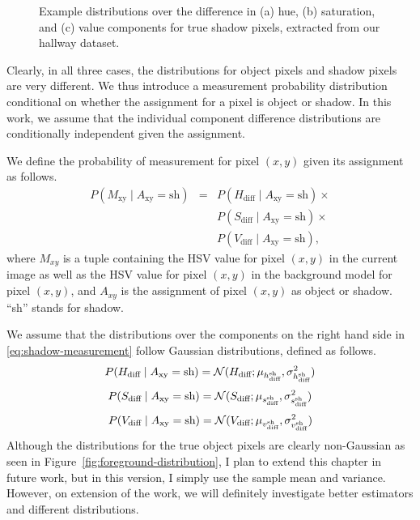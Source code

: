 \begin{figure}[t]
  \caption[Example distributions over the difference in hue,
    saturation, and value components for true shadow pixels, extracted
    from our hallway dataset.]{\small Example distributions over the
    difference in (a) hue, (b) saturation, and (c) value components
    for true shadow pixels, extracted from our hallway dataset.}
  \label{fig:shadow-distribution}
\end{figure}

Clearly, in all three cases, the distributions for object pixels and
shadow pixels are very different.  We thus introduce a measurement
probability distribution conditional on whether the assignment for a
pixel is object or shadow. In this work, we assume that the individual
component difference distributions are conditionally independent given
the assignment.

We define the probability of measurement for pixel $(x, y)$ given its 
assignment as follows.
\begin{equation}
  \label{eq:shadow-measurement}
  \begin{array}{ccl}
    P(M_{\text{xy}} \mid A_{\text{xy}} = \text{sh}) 
            & = & P(H_{\text{diff}} \mid A_{\text{xy}} = \text{sh}) \times \\
            &   & P(S_{\text{diff}} \mid A_{\text{xy}} = \text{sh}) \times \\
            &   & P(V_{\text{diff}} \mid A_{\text{xy}} = \text{sh}),
  \end{array}
\end{equation}
where $M_{xy}$ is a tuple containing the HSV value for pixel $(x,y)$
in the current image as well as the HSV value for pixel $(x,y)$ in the
background model for pixel $(x,y)$, and $A_{xy}$ is the assignment of
pixel $(x,y)$ as object or shadow. ``sh'' stands for shadow.

We assume that the distributions over the components on the right 
hand side in \ref{eq:shadow-measurement} 
follow Gaussian distributions, defined as follows.
\begin{equation*}
  P(H_{\text{diff}} \mid A_{\text{xy}} = \text{sh}) =
  {\cal N}(H_{\text{diff}} ;
  \mu_{h_{\text{diff}}^{\text{sh}}},
  \sigma^2_{h_{\text{diff}}^{\text{sh}}})
\end{equation*}
\begin{equation*}
  P(S_{\text{diff}} \mid A_{\text{xy}} = \text{sh}) =
  {\cal N}(S_{\text{diff}} ;
  \mu_{s_{\text{diff}}^{\text{sh}}},
  \sigma^2_{s_{\text{diff}}^{\text{sh}}})
\end{equation*}
\begin{equation*}
  P(V_{\text{diff}} \mid A_{\text{xy}} = \text{sh}) =
  {\cal N}(V_{\text{diff}} ;
  \mu_{v_{\text{diff}}^{\text{sh}}},
  \sigma^2_{v_{\text{diff}}^{\text{sh}}})
\end{equation*}
Although the distributions for the true object pixels are clearly 
non-Gaussian as seen in Figure~\ref{fig:foreground-distribution}, 
I plan to extend this chapter in future work, but in 
this version, I simply use the sample mean and variance. However, 
on extension of the work, we will definitely investigate better 
estimators and different distributions.


